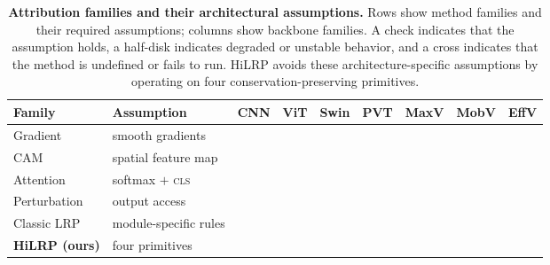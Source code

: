 \documentclass[lettersize,journal]{IEEEtran}
\theoremstyle{definition}
\theoremstyle{plain}
\newcommand{\cmark}{\ding{51}}
\newcommand{\xmark}{\ding{55}}
\newcommand{\hmark}{%
  \begin{tikzpicture}[scale=0.11, baseline=-0.6ex]
    \fill[orange] (0,0) circle (1);
    \fill[white] (0,0) -- (90:1.05) arc (90:-90:1.05) -- cycle;
  \end{tikzpicture}%
}
\begin{document}
\begin{table}[!tbp]
  \centering
  \caption{\textbf{Attribution families and their architectural assumptions.}
  Rows show method families and their required assumptions; columns show backbone
  families. A check indicates that the assumption holds, a half-disk indicates
  degraded or unstable behavior, and a cross indicates that the method is
  undefined or fails to run. HiLRP avoids these architecture-specific
  assumptions by operating on four conservation-preserving primitives.}
  \label{tab:taxonomy}
  \setlength{\tabcolsep}{1.8pt}
  \scriptsize
  \begin{tabular}{@{}llccccccc@{}}
    \toprule
    \textbf{Family} & \textbf{Assumption}
    & \textbf{CNN} & \textbf{ViT} & \textbf{Swin}
    & \textbf{PVT} & \textbf{MaxV} & \textbf{MobV} & \textbf{EffV} \\
    \midrule
    Gradient
      & smooth gradients
      & \cmark & \hmark & \hmark & \hmark & \hmark & \hmark & \hmark \\
    CAM
      & spatial feature map
      & \cmark & \hmark & \cmark & \cmark & \cmark & \cmark & \xmark \\
    Attention
      & softmax $+$ \textsc{cls}
      & \xmark & \cmark & \xmark & \xmark & \xmark & \xmark & \xmark \\
    Perturbation
      & output access
      & \cmark & \cmark & \cmark & \cmark & \cmark & \cmark & \cmark \\
    Classic LRP
      & module-specific rules
      & \cmark & \xmark & \xmark & \xmark & \xmark & \xmark & \xmark \\
    \midrule
    \rowcolor{green!10}
    \textbf{HiLRP (ours)}
      & four primitives
      & \cmark & \cmark & \cmark & \cmark & \cmark & \cmark & \cmark \\
    \bottomrule
  \end{tabular}
\end{table}
\end{document}
